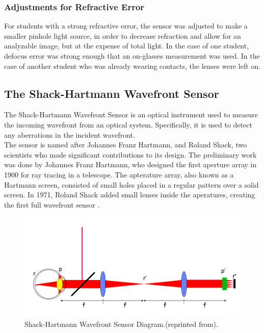 \documentclass{article}
\begin{document}
\subsubsection{Adjustments for Refractive Error} For students with a strong refractive error, the sensor was adjusted to make a smaller pinhole light source, in order to decrease refraction and allow for an analyzable image, but at the expense of total light. In the case of one student, defocus error was strong enough that an on-glasses measurement was used. In the case of another student who was already wearing contacts, the lenses were left on. \\

\subsection{The Shack-Hartmann Wavefront Sensor}
The Shack-Hartmann Wavefront Sensor is an optical instrument used to measure the incoming wavefront from an optical system. Specifically, it is used to detect any aberrations in the incident wavefront. \\

The sensor is named after Johannes Franz Hartmann, and Roland Shack, two scientists who made significant contributions to its design. The preliminary work was done by Johannes Franz Hartmann, who designed the first aperture array in 1900 for ray tracing in a telescope\cite{hartmann1900}. The apterature array, also known as a Hartmann screen, consisted of small holes placed in a regular pattern over a solid screen. In 1971, Roland Shack added small lenses inside the aperatures, creating the first full wavefront sensor \cite{shack71}.\\

\begin{figure}[h]
  \centering
    \includegraphics[width=.75\linewidth]{shwfs.png}
  \caption{Shack-Hartmann Wavefront Sensor Diagram.(reprinted from{\cite{austinsslides}}).}
  \label{fig:shwfs}
\end{figure}
\end{document}
